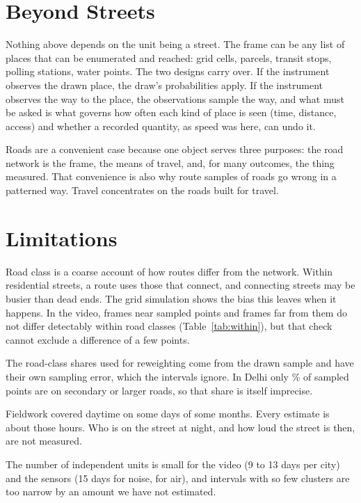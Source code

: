 \documentclass[11pt]{article}
\begin{document}
\section{Beyond Streets}

Nothing above depends on the unit being a street. The frame can be any list of places that can be enumerated and reached: grid cells, parcels, transit stops, polling stations, water points. The two designs carry over. If the instrument observes the drawn place, the draw's probabilities apply. If the instrument observes the way to the place, the observations sample the way, and what must be asked is what governs how often each kind of place is seen (time, distance, access) and whether a recorded quantity, as speed was here, can undo it.

Roads are a convenient case because one object serves three purposes: the road network is the frame, the means of travel, and, for many outcomes, the thing measured. That convenience is also why route samples of roads go wrong in a patterned way. Travel concentrates on the roads built for travel.

\section{Limitations}

Road class is a coarse account of how routes differ from the network. Within residential streets, a route uses those that connect, and connecting streets may be busier than dead ends. The grid simulation shows the bias this leaves when it happens. In the video, frames near sampled points and frames far from them do not differ detectably within road classes (Table~\ref{tab:within}), but that check cannot exclude a difference of a few points.

The road-class shares used for reweighting come from the drawn sample and have their own sampling error, which the intervals ignore. In Delhi only \samplemajorDelhi\% of sampled points are on secondary or larger roads, so that share is itself imprecise.

Fieldwork covered daytime on some days of some months. Every estimate is about those hours. Who is on the street at night, and how loud the street is then, are not measured.

The number of independent units is small for the video (9 to 13 days per city) and the sensors (15 days for noise, \airdays{} for air), and intervals with so few clusters are too narrow by an amount we have not estimated.
\end{document}
